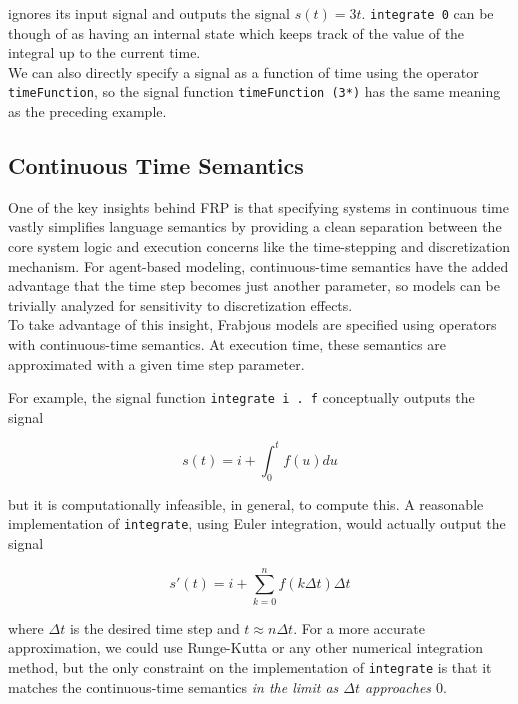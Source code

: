 \documentclass{article}
\begin{document}
 ignores its input signal and outputs the signal $s(t) = 3t$. \lstinline{integrate 0} can be though of as having an internal state which keeps track of the value of the integral up to the current time. \\
 
 We can also directly specify a signal as a function of time using the operator \lstinline{timeFunction}, so the signal function \lstinline{timeFunction (3*)} has the same meaning as the preceding example.

\subsection{Continuous Time Semantics}
One of the key insights behind FRP is that specifying systems in continuous time vastly simplifies language semantics by providing a clean separation between the core system logic and execution concerns like the time-stepping and discretization mechanism. For agent-based modeling, continuous-time semantics have the added advantage that the time step becomes just another parameter, so models can be trivially analyzed for sensitivity to discretization effects.\\

To take advantage of this insight, Frabjous models are specified using operators with continuous-time semantics. At execution time, these semantics are approximated with a given time step parameter. 

For example, the signal function \lstinline{integrate i . f} conceptually outputs the signal 


$$ s(t) = i+  \int_0^t f(u)du $$

but it is computationally infeasible, in general, to compute this. A reasonable implementation of \lstinline{integrate}, using Euler integration, would actually output the signal

$$ s'(t) =  i + \sum_{k=0}^n f(k\Delta t) \Delta t $$

where $\Delta t$ is the desired time step and $ t \approx n\Delta t $. For a more accurate approximation, we could use Runge-Kutta or any other numerical integration method, but the only constraint on the implementation of \lstinline{integrate} is that it matches the continuous-time semantics \emph{in the limit as $\Delta t$ approaches $0$}.

\end{document}
